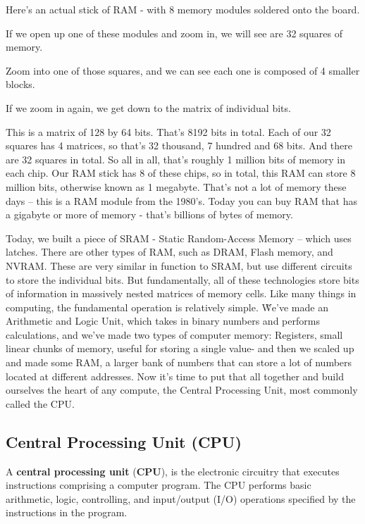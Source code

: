\be
Here's an actual stick of RAM - with 8 memory modules soldered onto the board.


If we open up one of these modules and zoom in, we will see are 32 squares of memory.


Zoom into one of those squares, and we can see each one is composed of 4 smaller blocks.


If we zoom in again, we get down to the matrix of individual bits.


This is a matrix of 128 by 64 bits. That's 8192 bits in total. Each of our 32 squares has 4 matrices, so that's 32
thousand, 7 hundred and 68 bits. And there are 32 squares in total. So all in all, that's roughly 1 million bits of
memory in each chip. Our RAM stick has 8 of these chips, so in total, this RAM can store 8 million bits, otherwise
known as 1 megabyte. That's not a lot of memory these days -- this is a RAM module from the 1980's. Today you can buy
RAM that has a gigabyte or more of memory - that's billions of bytes of memory.
\ee

Today, we built a piece of SRAM - Static Random-Access Memory – which uses latches. There are other types of RAM,
such as DRAM, Flash memory, and NVRAM. These are very similar in function to SRAM, but use different circuits to
store the individual bits. But fundamentally, all of these technologies store bits of information in massively nested
matrices of memory cells. Like many things in computing, the fundamental operation is relatively simple. \v

We've made an Arithmetic and Logic Unit, which takes in binary numbers and performs calculations, and we've made two
types of computer memory: Registers, small linear chunks of memory, useful for storing a single value- and then we
scaled up and made some RAM, a larger bank of numbers that can store a lot of numbers located at different addresses.
Now it's time to put that all together and build ourselves the heart of any compute, the Central Processing Unit,
most commonly called the CPU\@.

\subsection{Central Processing Unit (CPU)}

A \textbf{central processing unit} (\textbf{CPU}), is the electronic circuitry that executes instructions comprising
a computer program. The CPU performs basic arithmetic, logic, controlling, and input/output (I/O) operations
specified by the instructions in the program.
\ed

